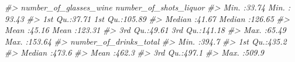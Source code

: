 \documentclass[
  12pt,
  openany]{book}
\newenvironment{Shaded}{\begin{snugshade}}{\end{snugshade}}
\newcommand{\CommentTok}[1]{\textcolor[rgb]{0.37,0.37,0.37}{\textit{#1}}}
\begin{document}
\begin{Shaded}
\begin{Highlighting}[]
\CommentTok{\#\textgreater{}  number\_of\_glasses\_wine number\_of\_shots\_liquor}
\CommentTok{\#\textgreater{}  Min.   :33.74          Min.   : 93.43        }
\CommentTok{\#\textgreater{}  1st Qu.:37.71          1st Qu.:105.89        }
\CommentTok{\#\textgreater{}  Median :41.67          Median :126.65        }
\CommentTok{\#\textgreater{}  Mean   :45.16          Mean   :123.31        }
\CommentTok{\#\textgreater{}  3rd Qu.:49.61          3rd Qu.:141.18        }
\CommentTok{\#\textgreater{}  Max.   :65.49          Max.   :153.64        }
\CommentTok{\#\textgreater{}  number\_of\_drinks\_total}
\CommentTok{\#\textgreater{}  Min.   :394.7         }
\CommentTok{\#\textgreater{}  1st Qu.:435.2         }
\CommentTok{\#\textgreater{}  Median :473.6         }
\CommentTok{\#\textgreater{}  Mean   :462.3         }
\CommentTok{\#\textgreater{}  3rd Qu.:497.1         }
\CommentTok{\#\textgreater{}  Max.   :509.9}
\end{Highlighting}
\end{Shaded}
\end{document}
